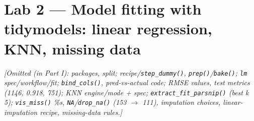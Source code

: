 \section{Lab 2 --- Model fitting with tidymodels: linear regression, KNN, missing data}
{\color{figgray}\itshape [Omitted (in Part I): packages, split; recipe/\texttt{step\_dummy()}, \texttt{prep()}/\texttt{bake()}; \texttt{lm} spec/workflow/fit; \texttt{bind\_cols()}, pred-vs-actual code; RMSE values, test metrics (1146, 0.918, 751); KNN engine/mode + spec; \texttt{extract\_fit\_parsnip()} (best k 5); \texttt{vis\_miss()} \%s, \texttt{NA}/\texttt{drop\_na()} (153 $\to$ 111), imputation choices, linear-imputation recipe, missing-data rules.]}
%

